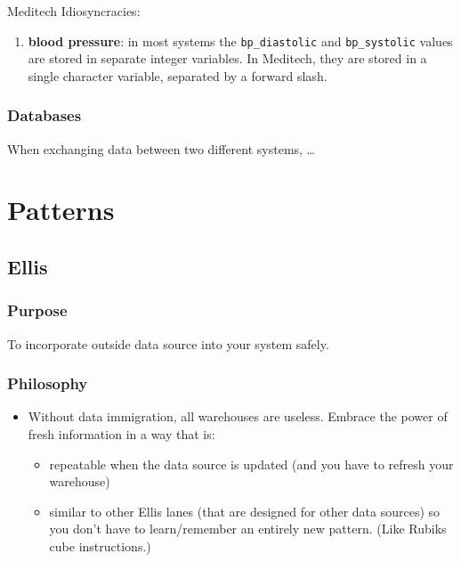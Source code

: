 \documentclass[
]{book}
\providecommand{\tightlist}{%
  \setlength{\itemsep}{0pt}\setlength{\parskip}{0pt}}
\begin{document}
Meditech Idiosyncracies:

\begin{enumerate}
\def\labelenumi{\arabic{enumi}.}
\tightlist
\item
  \textbf{blood pressure}: in most systems the \texttt{bp\_diastolic} and \texttt{bp\_systolic} values are stored in separate integer variables. In Meditech, they are stored in a single character variable, separated by a forward slash.
\end{enumerate}

\hypertarget{data-conventions-database}{%
\subsection{Databases}\label{data-conventions-database}}

When exchanging data between two different systems, \ldots{}

\hypertarget{patterns}{%
\chapter{Patterns}\label{patterns}}

\hypertarget{pattern-ellis}{%
\section{Ellis}\label{pattern-ellis}}

\hypertarget{purpose}{%
\subsection{Purpose}\label{purpose}}

To incorporate outside data source into your system safely.

\hypertarget{philosophy}{%
\subsection{Philosophy}\label{philosophy}}

\begin{itemize}
\item
  Without data immigration, all warehouses are useless. Embrace the power of fresh information in a way that is:

  \begin{itemize}
  \tightlist
  \item
    repeatable when the data source is updated (and you have to refresh your warehouse)
  \item
    similar to other Ellis lanes (that are designed for other data sources) so you don't have to learn/remember an entirely new pattern. (Like Rubiks cube instructions.)
  \end{itemize}
\end{itemize}
\end{document}

